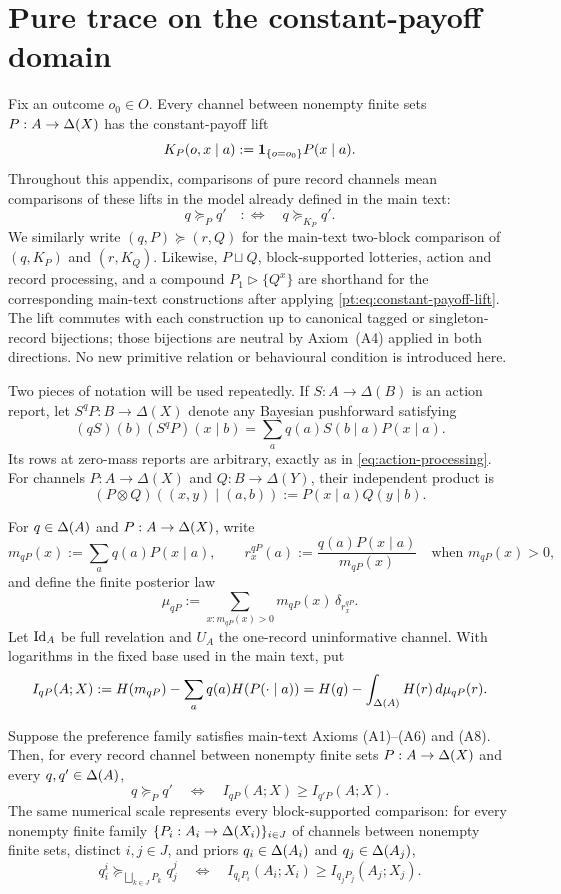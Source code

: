 \section{Pure trace on the constant-payoff domain}
\label{pt:sec:environment}\label{lf:app:pure-trace}

Fix an outcome $o_0\in O$.  Every channel between nonempty finite sets
$P:A\to\Delta(X)$ has the constant-payoff lift
\begin{equation}
K_P(o,x\mid a):=\mathbf 1_{\{o=o_0\}}P(x\mid a).
\label{pt:eq:constant-payoff-lift}
\end{equation}
Throughout this appendix, comparisons of pure record channels mean comparisons
of these lifts in the model already defined in the main text:
\[
q\succeq_Pq'\quad:\Longleftrightarrow\quad q\succeq_{K_P}q'.
\]
We similarly write $(q,P)\succeq(r,Q)$ for the main-text two-block
comparison of $(q,K_P)$ and $(r,K_Q)$.
Likewise, $P\sqcup Q$, block-supported lotteries, action and record
processing, and a compound $P_1\triangleright\{Q^x\}$ are shorthand for the
corresponding main-text constructions after applying
\eqref{pt:eq:constant-payoff-lift}.  The lift commutes with each construction
up to canonical tagged or singleton-record bijections; those bijections are
neutral by Axiom~\textup{(A4)} applied in both directions.  No new primitive
relation or behavioural condition is introduced here.

Two pieces of notation will be used repeatedly.  If
$S:A\to\Delta(B)$ is an action report, let $S^qP:B\to\Delta(X)$ denote any
Bayesian pushforward satisfying
\[
 (qS)(b)(S^qP)(x\mid b)
 =\sum_a q(a)S(b\mid a)P(x\mid a).
\]
Its rows at zero-mass reports are arbitrary, exactly as in
\eqref{eq:action-processing}.  For channels $P:A\to\Delta(X)$ and
$Q:B\to\Delta(Y)$, their independent product is
\[
 (P\otimes Q)((x,y)\mid(a,b)):=P(x\mid a)Q(y\mid b).
\]

For $q\in\Delta(A)$ and $P:A\to\Delta(X)$, write
\[
m_{qP}(x):=\sum_a q(a)P(x\mid a),
\qquad
r_x^{qP}(a):=\frac{q(a)P(x\mid a)}{m_{qP}(x)}
\quad\text{when }m_{qP}(x)>0,
\]
and define the finite posterior law
\[
\mu_{qP}:=
\sum_{x:m_{qP}(x)>0}m_{qP}(x)\,\delta_{r_x^{qP}}.
\]
Let $\operatorname{Id}_A$ be full revelation and $U_A$ the one-record uninformative
channel.  With logarithms in the fixed base used in the main text, put
\[
I_{qP}(A;X)
:=H(m_{qP})-\sum_a q(a)H(P(\cdot\mid a))
=H(q)-\int_{\Delta(A)}H(r)\,d\mu_{qP}(r).
\]

\begin{proposition}\label{pt:prop:main}
Suppose the preference family satisfies main-text Axioms
\textup{(A1)--(A6)} and \textup{(A8)}.  Then, for every record channel between
nonempty finite sets
$P:A\to\Delta(X)$ and every $q,q'\in\Delta(A)$,
\[
q\succeq_Pq'
\quad\Longleftrightarrow\quad
I_{qP}(A;X)\ge I_{q'P}(A;X).
\]
The same numerical scale represents every block-supported comparison: for
every nonempty finite family $\{P_i:A_i\to\Delta(X_i)\}_{i\in J}$ of channels
between nonempty finite sets, distinct $i,j\in J$,
and priors $q_i\in\Delta(A_i)$ and $q_j\in\Delta(A_j)$,
\[
q_i^i\succeq_{\bigsqcup_{k\in J}P_k}q_j^j
\quad\Longleftrightarrow\quad
I_{q_iP_i}(A_i;X_i)\ge I_{q_jP_j}(A_j;X_j).
\]
\end{proposition}

